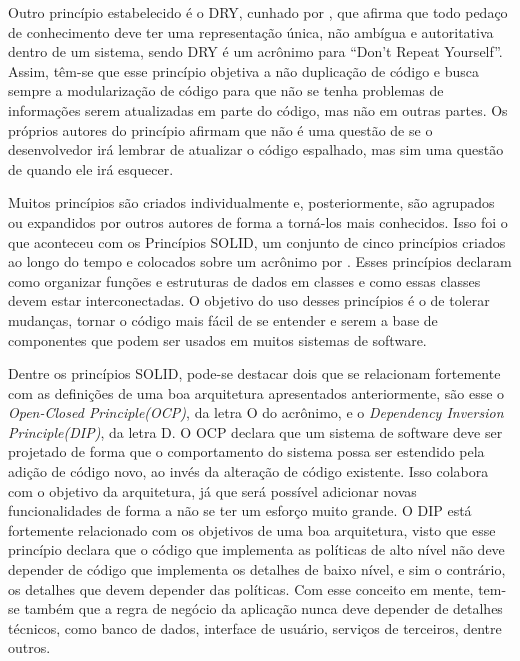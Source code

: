 \documentclass[12pt, %
openright, 
oneside, %
a4paper,    %
brazil]{facom-ufu-abntex2}
\begin{document}
Outro princípio estabelecido é o DRY, cunhado por , que afirma que todo pedaço de conhecimento deve ter uma representação única, não ambígua e autoritativa dentro de um sistema, sendo DRY é um acrônimo para ``Don't Repeat Yourself''. Assim, têm-se que esse princípio objetiva a não duplicação de código e busca sempre a modularização de código para que não se tenha problemas de informações serem atualizadas em parte do código, mas não em outras partes. Os próprios autores do princípio afirmam que não é uma questão de se o desenvolvedor irá lembrar de atualizar o código espalhado, mas sim uma questão de quando ele irá esquecer.

Muitos princípios são criados individualmente e, posteriormente, são agrupados ou expandidos por outros autores de forma a torná-los mais conhecidos. Isso foi o que aconteceu com os Princípios SOLID, um conjunto de cinco princípios criados ao longo do tempo e colocados sobre um acrônimo por . Esses princípios declaram como organizar funções e estruturas de dados em classes e como essas classes devem estar interconectadas. O objetivo do uso desses princípios é o de tolerar mudanças, tornar o código mais fácil de se entender e serem a base de componentes que podem ser usados em muitos sistemas de software.

Dentre os princípios SOLID, pode-se destacar dois que se relacionam fortemente com as definições de uma boa arquitetura apresentados anteriormente, são esse o \textit{Open-Closed Principle(OCP)}, da letra O do acrônimo, e o \textit{Dependency Inversion Principle(DIP)}, da letra D. O OCP declara que um sistema de software deve ser projetado de forma que o comportamento do sistema possa ser estendido pela adição de código novo, ao invés da alteração de código existente. Isso colabora com o objetivo da arquitetura, já que será possível adicionar novas funcionalidades de forma a não se ter um esforço muito grande. O DIP está fortemente relacionado com os objetivos de uma boa arquitetura, visto que esse princípio declara que o código que implementa as políticas de alto nível não deve depender de código que implementa os detalhes de baixo nível, e sim o contrário, os detalhes que devem depender das políticas. Com esse conceito em mente, tem-se também que a regra de negócio da aplicação nunca deve depender de detalhes técnicos, como banco de dados, interface de usuário, serviços de terceiros, dentre outros.
\end{document}
